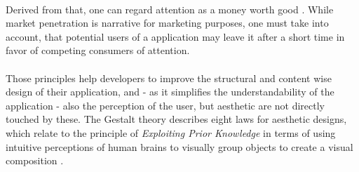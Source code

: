 \paragraph*{} Derived from that, one can regard attention as a money worth good \parencite[cf.][]{Davenport.2001}. While market penetration is narrative for marketing purposes, one must take into account, that potential users of a application may leave it after a short time in favor of competing consumers of attention.
\paragraph*{} Those principles help developers to improve the structural and content wise design of their application, and - as it simplifies the understandability of the application - also the perception of the user, but aesthetic are not directly touched by these. The Gestalt theory describes eight laws for aesthetic designs, which relate to the principle of \textit{Exploiting Prior Knowledge} in terms of using intuitive perceptions of human brains to visually group objects to create a visual composition \parencite[cf.][113]{Sternberg.2012}.
